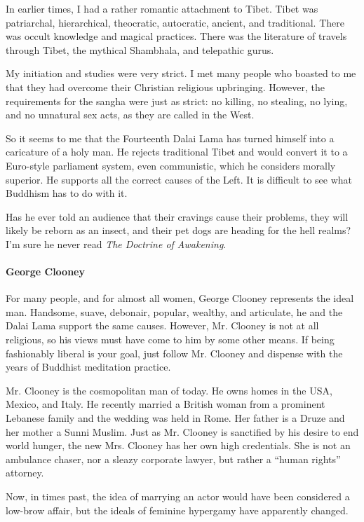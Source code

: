 In earlier times, I had a rather romantic attachment to Tibet. Tibet was patriarchal, hierarchical, theocratic, autocratic, ancient, and traditional. There was occult knowledge and magical practices. There was the literature of travels through Tibet, the mythical Shambhala, and telepathic gurus.

My initiation and studies were very strict. I met many people who boasted to me that they had overcome their Christian religious upbringing. However, the requirements for the sangha were just as strict: no killing, no stealing, no lying, and no unnatural sex acts, as they are called in the West.

So it seems to me that the Fourteenth Dalai Lama has turned himself into a caricature of a holy man. He rejects traditional Tibet and would convert it to a Euro-style parliament system, even communistic, which he considers morally superior. He supports all the correct causes of the Left. It is difficult to see what Buddhism has to do with it.

Has he ever told an audience that their cravings cause their problems, they will likely be reborn as an insect, and their pet dogs are heading for the hell realms? I'm sure he never read \emph{The Doctrine of Awakening}.

\paragraph{George Clooney}


For many people, and for almost all women, George Clooney represents the ideal man. Handsome, suave, debonair, popular, wealthy, and articulate, he and the Dalai Lama support the same causes. However, Mr. Clooney is not at all religious, so his views must have come to him by some other means. If being fashionably liberal is your goal, just follow Mr. Clooney and dispense with the years of Buddhist meditation practice.

Mr. Clooney is the cosmopolitan man of today. He owns homes in the USA, Mexico, and Italy. He recently married a British woman from a prominent Lebanese family and the wedding was held in Rome. Her father is a Druze and her mother a Sunni Muslim. Just as Mr. Clooney is sanctified by his desire to end world hunger, the new Mrs. Clooney has her own high credentials. She is not an ambulance chaser, nor a sleazy corporate lawyer, but rather a ``human rights'' attorney.

Now, in times past, the idea of marrying an actor would have been considered a low-brow affair, but the ideals of feminine hypergamy have apparently changed.

